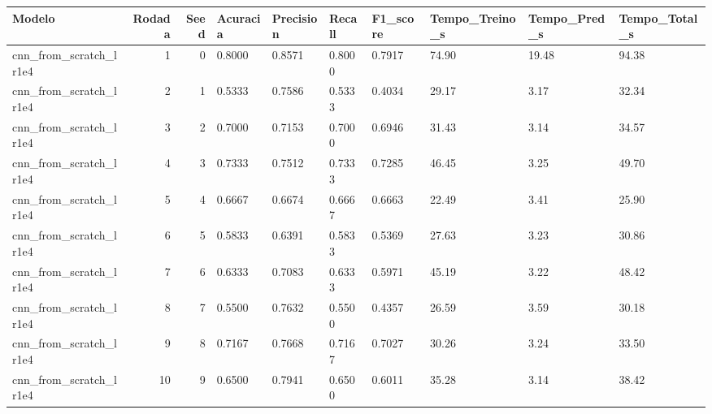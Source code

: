 \begin{tabular}{lrrlllllll}
\toprule
Modelo & Rodada & Seed & Acuracia & Precision & Recall & F1_score & Tempo_Treino_s & Tempo_Pred_s & Tempo_Total_s \\
\midrule
cnn_from_scratch_lr1e4 & 1 & 0 & 0.8000 & 0.8571 & 0.8000 & 0.7917 & 74.90 & 19.48 & 94.38 \\
cnn_from_scratch_lr1e4 & 2 & 1 & 0.5333 & 0.7586 & 0.5333 & 0.4034 & 29.17 & 3.17 & 32.34 \\
cnn_from_scratch_lr1e4 & 3 & 2 & 0.7000 & 0.7153 & 0.7000 & 0.6946 & 31.43 & 3.14 & 34.57 \\
cnn_from_scratch_lr1e4 & 4 & 3 & 0.7333 & 0.7512 & 0.7333 & 0.7285 & 46.45 & 3.25 & 49.70 \\
cnn_from_scratch_lr1e4 & 5 & 4 & 0.6667 & 0.6674 & 0.6667 & 0.6663 & 22.49 & 3.41 & 25.90 \\
cnn_from_scratch_lr1e4 & 6 & 5 & 0.5833 & 0.6391 & 0.5833 & 0.5369 & 27.63 & 3.23 & 30.86 \\
cnn_from_scratch_lr1e4 & 7 & 6 & 0.6333 & 0.7083 & 0.6333 & 0.5971 & 45.19 & 3.22 & 48.42 \\
cnn_from_scratch_lr1e4 & 8 & 7 & 0.5500 & 0.7632 & 0.5500 & 0.4357 & 26.59 & 3.59 & 30.18 \\
cnn_from_scratch_lr1e4 & 9 & 8 & 0.7167 & 0.7668 & 0.7167 & 0.7027 & 30.26 & 3.24 & 33.50 \\
cnn_from_scratch_lr1e4 & 10 & 9 & 0.6500 & 0.7941 & 0.6500 & 0.6011 & 35.28 & 3.14 & 38.42 \\
\bottomrule
\end{tabular}
